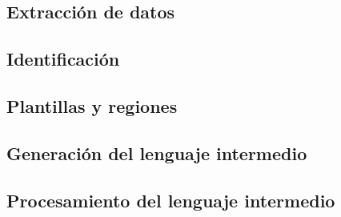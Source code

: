 

\subsection{Extracción de datos}




\subsection{Identificación}


\subsection{Plantillas y regiones}

\subsection{Generación del lenguaje intermedio}

\subsection{Procesamiento del lenguaje intermedio}

